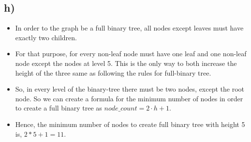 \documentclass[11pt]{article}
\begin{document}
\subsection*{h)}
    \begin{itemize}
        \item In order to the graph be a full binary tree, all nodes except leaves must have exactly two children.
        \item For that purpose, for every non-leaf node must have one leaf and one non-leaf node except the nodes at level 5. This is the only way to both increase the height of the three same as following the rules for full-binary tree.
        \item So, in every level of the binary-tree there must be two nodes, except the root node. So we can create a formula for the minimum number of nodes in order to create a full binary tree as $node\_count = 2 \cdot h + 1$.
        \item Hence, the minimum number of nodes to create full binary tree with height 5 is, $2 * 5 + 1 = 11$.
        
        \begin{figure}[H]
        	\centering
        \end{figure}
    \end{itemize}{}
    
\end{document}
